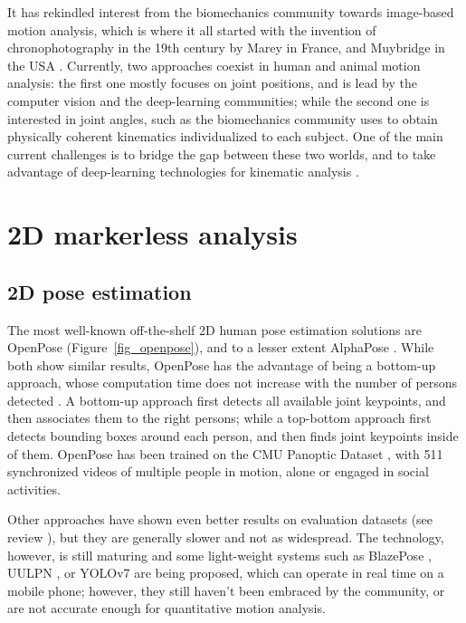 It has rekindled interest from the biomechanics community towards image-based motion analysis, which is where it all started with the invention of chronophotography in the 19th century by Marey in France, and Muybridge in the USA \cite{Baker2007}. Currently, two approaches coexist in human and animal motion analysis: the first one mostly focuses on joint positions, and is lead by the computer vision and the deep-learning communities; while the second one is interested in joint angles, such as the biomechanics community uses to obtain physically coherent kinematics individualized to each subject. One of the main current challenges is to bridge the gap between these two worlds, and to take advantage of deep-learning technologies for kinematic analysis \cite{Cronin2021,Seethapathi2019}. 

\FloatBarrier
\section{2D markerless analysis}
\subsection{2D pose estimation}

The most well-known off-the-shelf 2D human pose estimation solutions are OpenPose \cite{Cao2019} (Figure~\ref{fig_openpose}), and to a lesser extent AlphaPose \cite{Fang2017}. While both show similar results, OpenPose has the advantage of being a bottom-up approach, whose computation time does not increase with the number of persons detected \cite{Cao2019}. A bottom-up approach first detects all available joint keypoints, and then associates them to the right persons; while a top-bottom approach first detects bounding boxes around each person, and then finds joint keypoints inside of them. OpenPose has been trained on the CMU Panoptic Dataset \cite{Joo2015}, with 511 synchronized videos of multiple people in motion, alone or engaged in social activities. 

Other approaches have shown even better results on evaluation datasets (see review \cite{Chen2020}), but they are generally slower and not as widespread. The technology, however, is still maturing and some light-weight systems such as BlazePose \cite{Bazarevsky2020}, UULPN \cite{Wang2022a}, or YOLOv7 \cite{Wang2022b} are being proposed, which can operate in real time on a mobile phone; however, they still haven't been embraced by the community, or are not accurate enough for quantitative motion analysis.

